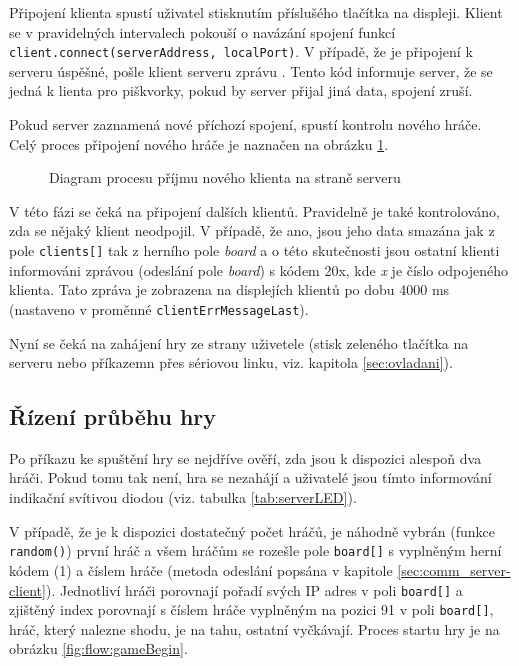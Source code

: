 Připojení klienta spustí uživatel stisknutím příslušého tlačítka na displeji. Klient se v pravidelných intervalech pokouší o navázání spojení funkcí  \\ \mbox{\texttt{client.connect(serverAddress, localPort)}}. V případě, že je připojení k serveru úspěšné, pošle klient serveru zprávu . Tento kód informuje server, že se jedná k lienta pro piškvorky, pokud by server přijal jiná data, spojení zruší.

Pokud server zaznamená nové příchozí spojení, spustí kontrolu nového hráče. Celý proces připojení nového hráče je naznačen na obrázku \ref{fig:flow:newClientServer}.

\begin{figure}
  \centering
  
  \caption{\label{fig:flow:newClientServer} Diagram procesu příjmu nového klienta na straně serveru}
\end{figure}

V této fázi se čeká na připojení dalších klientů. Pravidelně je také kontrolováno, zda se nějaký klient neodpojil. V případě, že ano, jsou jeho data smazána jak z pole \texttt{clients[]} tak z herního pole \textit{board} a o této skutečnosti jsou ostatní klienti informováni zprávou (odeslání pole \textit{board}) s kódem 20x, kde \textit{x} je číslo odpojeného klienta. Tato zpráva je zobrazena na displejích klientů po dobu 4000 ms (nastaveno v proměnné \texttt{clientErrMessageLast}).

Nyní se čeká na zahájení hry ze strany uživetele (stisk zeleného tlačítka na serveru nebo příkazemn přes sériovou linku, viz. kapitola \ref{sec:ovladani}).

\subsection{Řízení průběhu hry}
Po příkazu ke spuštění hry se nejdříve ověří, zda jsou k dispozici alespoň dva hráči. Pokud tomu tak není, hra se nezahájí a uživatelé jsou tímto informování indikační svítivou diodou (viz. tabulka \ref{tab:serverLED}).

V případě, že je k dispozici dostatečný počet hráčů, je náhodně vybrán (funkce \texttt{random()}) první hráč a všem hráčům se rozešle pole \texttt{board[]} s vyplněným herní kódem (1) a číslem hráče (metoda odeslání popsána v kapitole \ref{sec:comm_server-client}). Jednotliví hráči porovnají pořadí svých IP adres v poli \texttt{board[]} a zjištěný index porovnají s číslem hráče vyplněným na pozici 91 v poli \texttt{board[]}, hráč, který nalezne shodu, je na tahu, ostatní vyčkávají. Proces startu hry je na obrázku \ref{fig:flow:gameBegin}.


